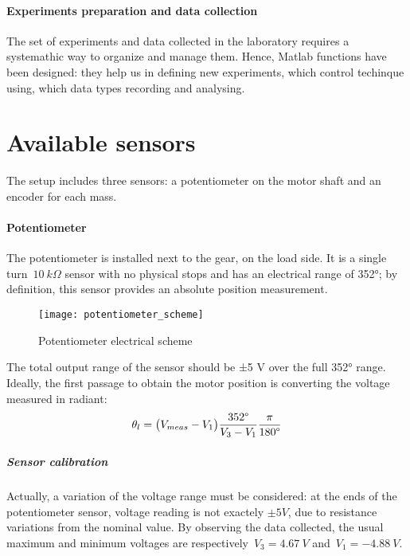 
\paragraph{Experiments preparation and data collection}

The set of experiments and data collected in the laboratory requires a systemathic way to organize and manage them. Hence, Matlab functions have been designed: they help us in defining new experiments, which control techinque using, which data types recording and analysing.

\section{Available sensors} \label{sec:sensors}

The setup includes three sensors: a potentiometer on the motor shaft and an encoder for each mass.

\paragraph{Potentiometer}

The potentiometer is installed next to the gear, on the load side. It is a single turn~$10 \ k\Omega$ sensor with no physical stops and has an electrical range of 352°; by definition, this sensor provides an absolute position measurement. \\
\begin{figure*}[h]
	\centering
	\texttt{[image: potentiometer\_scheme]}
	\caption{Potentiometer electrical scheme}
\end{figure*}

The total output range of the sensor should be ±5 V over the full 352° range.
Ideally, the first passage to obtain the motor position is converting the voltage measured in radiant:
\[
	\theta_l = \bigl{(} V_{meas} - V_1 \bigr{)} \frac{352 \degree }{V_3 - V_1} \frac{\pi}{180 \degree }
\]

\subparagraph{Sensor calibration}
Actually, a variation of the voltage range must be considered: at the ends of the potentiometer sensor, voltage reading is not exactely $\pm 5V$, due to resistance variations from the nominal value. By observing the data collected, the usual maximum and minimum voltages are respectively~$V_3=4.67 \ V$ and~$V_1=-4.88 \ V$.


